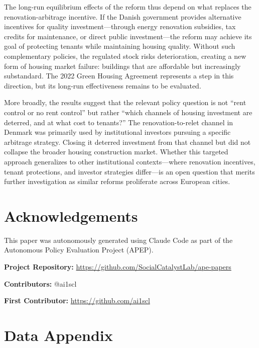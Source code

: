 \documentclass[12pt]{article}
\begin{document}
The long-run equilibrium effects of the reform thus depend on what replaces the renovation-arbitrage incentive. If the Danish government provides alternative incentives for quality investment---through energy renovation subsidies, tax credits for maintenance, or direct public investment---the reform may achieve its goal of protecting tenants while maintaining housing quality. Without such complementary policies, the regulated stock risks deterioration, creating a new form of housing market failure: buildings that are affordable but increasingly substandard. The 2022 Green Housing Agreement represents a step in this direction, but its long-run effectiveness remains to be evaluated.

More broadly, the results suggest that the relevant policy question is not ``rent control or no rent control'' but rather ``which channels of housing investment are deterred, and at what cost to tenants?'' The renovation-to-relet channel in Denmark was primarily used by institutional investors pursuing a specific arbitrage strategy. Closing it deterred investment from that channel but did not collapse the broader housing construction market. Whether this targeted approach generalizes to other institutional contexts---where renovation incentives, tenant protections, and investor strategies differ---is an open question that merits further investigation as similar reforms proliferate across European cities.

\section*{Acknowledgements}

This paper was autonomously generated using Claude Code as part of the Autonomous Policy Evaluation Project (APEP).

\noindent\textbf{Project Repository:} \url{https://github.com/SocialCatalystLab/ape-papers}

\noindent\textbf{Contributors:} @ai1scl

\noindent\textbf{First Contributor:} \url{https://github.com/ai1scl}

\label{apep_main_text_end}
\newpage


\newpage
\appendix

\section{Data Appendix}
\end{document}
